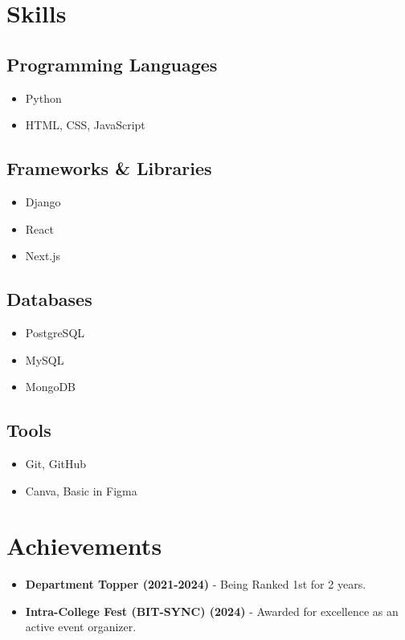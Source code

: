 \documentclass[11pt]{article}
\begin{document}
\section{Skills}
\subsection{Programming Languages}
\begin{itemize}
    \item Python
    \item HTML, CSS, JavaScript
\end{itemize}

\subsection{Frameworks \& Libraries}
\begin{itemize}
    \item Django
    \item React
    \item Next.js
\end{itemize}

\subsection{Databases}
\begin{itemize}
    \item PostgreSQL
    \item MySQL
    \item MongoDB
\end{itemize}

\subsection{Tools}
\begin{itemize}
    \item Git, GitHub
    \item Canva, Basic in Figma
\end{itemize}

\section{Achievements}
\begin{itemize}
    \item[\faCertificate] \textbf{Department Topper (2021-2024)} - Being Ranked 1st for 2 years.
    \item[\faTrophy] \textbf{Intra-College Fest (BIT-SYNC) (2024)} - Awarded for excellence as an active event organizer.
\end{itemize}
\end{document}

